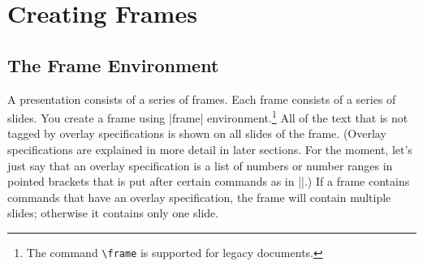 %
%
%

\section{Creating Frames}
\label{section-frames}


\subsection{The Frame Environment}

A presentation consists of a series of frames. Each frame consists of a series of slides. You create a frame using |frame| environment.\footnote{The command \texttt{\textbackslash frame} is supported for legacy documents.} All of the text that is not tagged by overlay specifications is shown on all slides of the frame. (Overlay specifications are explained in more detail in later sections. For the moment, let's just say that an overlay specification is a list of numbers or number ranges in pointed brackets that is put after certain commands as in ||.) If a frame contains commands that have an overlay specification, the frame will contain multiple slides; otherwise it contains only one slide.

